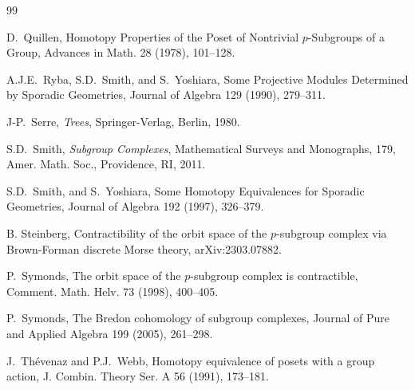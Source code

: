 \documentclass[12pt]{amsart}
\theoremstyle{plain}
\theoremstyle{definition}
\theoremstyle{remark}
\numberwithin{equation}{section}
\begin{document}
\begin{thebibliography}{99}


D.~Quillen, Homotopy Properties of the Poset of Nontrivial $p$-Subgroups of a Group, Advances in Math. 28 (1978), 101--128.

A.J.E.~Ryba, S.D.~Smith, and S.~Yoshiara, Some Projective Modules Determined by Sporadic Geometries, Journal of Algebra 129 (1990), 279--311.

J-P.~Serre, \textit{Trees}, Springer-Verlag, Berlin, 1980.


S.D.~Smith, \textit{Subgroup Complexes}, Mathematical Surveys and Monographs, 179, Amer. Math. Soc., Providence, RI, 2011.

S.D.~Smith, and S.~Yoshiara, Some Homotopy Equivalences for Sporadic Geometries, Journal of Algebra 192 (1997), 326--379.

 B. Steinberg, Contractibility of the orbit space of the $p$-subgroup complex via Brown-Forman discrete Morse theory, arXiv:2303.07882.

P.~Symonds, The orbit space of the $p$-subgroup complex is contractible, Comment. Math. Helv. 73 (1998), 400--405.

P.~Symonds, The Bredon cohomology of subgroup complexes, Journal of Pure and Applied Algebra 199 (2005), 261--298.

J.~Th\'evenaz and P.J.~Webb, Homotopy equivalence of posets with a group action, J. Combin. Theory Ser. A 56 (1991), 173--181.





\end{thebibliography}
\end{document}
